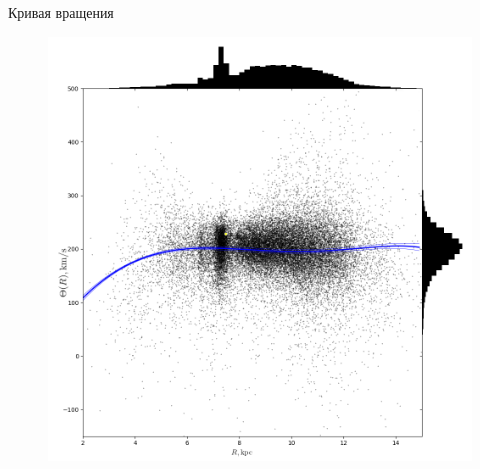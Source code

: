 \documentclass[compress]{beamer}
\begin{document}
\begin{frame}{Кривая вращения}
\begin{figure}[h!!]
\begin{center}
\begin{minipage}[p]{0.65\linewidth}
        \includegraphics[width=1.0\textwidth]{../imgs/theta_obj.png}
\end{minipage}
\end{center}
\end{figure}
\end{frame}
\end{document}
